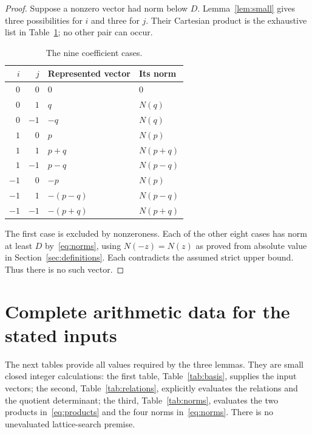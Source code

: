 \documentclass{article}
\begin{document}
\begin{proof}
  Suppose a nonzero vector had norm below \(D\). Lemma~\ref{lem:small} gives
  three possibilities for \(i\) and three for \(j\). Their Cartesian product
  is the exhaustive list in Table~\ref{tab:cases}; no other pair can occur.

  \begin{table}[htbp]
    \centering
    \caption{The nine coefficient cases.}
    \label{tab:cases}
    \begin{tabular}{rrll}
      \(i\) & \(j\) & Represented vector & Its norm \\
      \hline
      \(0\) & \(0\) & \(0\) & \(0\) \\
      \(0\) & \(1\) & \(q\) & \(N(q)\) \\
      \(0\) & \(-1\) & \(-q\) & \(N(q)\) \\
      \(1\) & \(0\) & \(p\) & \(N(p)\) \\
      \(1\) & \(1\) & \(p+q\) & \(N(p+q)\) \\
      \(1\) & \(-1\) & \(p-q\) & \(N(p-q)\) \\
      \(-1\) & \(0\) & \(-p\) & \(N(p)\) \\
      \(-1\) & \(1\) & \(-(p-q)\) & \(N(p-q)\) \\
      \(-1\) & \(-1\) & \(-(p+q)\) & \(N(p+q)\) \\
    \end{tabular}
  \end{table}

  The first case is excluded by nonzeroness. Each of the other eight
  cases has norm at least \(D\) by~\eqref{eq:norms}, using \(N(-z)=N(z)\) as proved from
  absolute value in Section~\ref{sec:definitions}. Each contradicts the assumed strict upper
  bound. Thus there is no such vector.
\end{proof}

\section{Complete arithmetic data for the stated inputs}\label{sec:data}

The next tables provide all values required by the three lemmas. They
are small closed integer calculations: the first table, Table~\ref{tab:basis}, supplies the
input vectors; the second, Table~\ref{tab:relations}, explicitly evaluates the relations
and the quotient determinant; the third, Table~\ref{tab:norms}, evaluates the two products
in~\eqref{eq:products} and the four norms in~\eqref{eq:norms}. There is no unevaluated
lattice-search premise.
\end{document}
